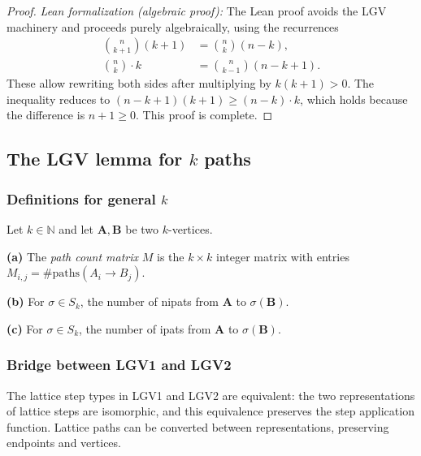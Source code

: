 \begin{proof}
\emph{Lean formalization (algebraic proof):} The Lean proof avoids the
LGV machinery and proceeds purely algebraically, using the recurrences
\begin{align*}
  \binom{n}{k+1}(k+1) &= \binom{n}{k}(n-k), \\
  \binom{n}{k} \cdot k &= \binom{n}{k-1}(n-k+1).
\end{align*}
These allow rewriting both sides after multiplying by $k(k+1) > 0$.
The inequality reduces to $(n-k+1)(k+1) \ge (n-k) \cdot k$, which
holds because the difference is $n + 1 \ge 0$. This proof is
complete.
\end{proof}

\subsection{The LGV lemma for $k$ paths}

\subsubsection{Definitions for general $k$}

\begin{definition}
\label{def.lgv.pathmatrixK}
\leanhelper
\leanok
Let $k \in \mathbb{N}$ and let $\mathbf{A}, \mathbf{B}$ be two $k$-vertices.

\textbf{(a)} The \emph{path count matrix} $M$
is the $k \times k$ integer matrix with entries
$M_{i,j} = \#\mathrm{paths}(A_i \to B_j)$.

\textbf{(b)} For $\sigma \in S_k$, the number of nipats from $\mathbf{A}$ to $\sigma(\mathbf{B})$.

\textbf{(c)} For $\sigma \in S_k$, the number of ipats from $\mathbf{A}$ to $\sigma(\mathbf{B})$.
\end{definition}

\subsubsection{Bridge between LGV1 and LGV2}

\begin{lemma}
\label{lem.lgv.step-equiv}
\leanhelper
\leanok
The lattice step types in LGV1 and LGV2 are equivalent:
the two representations of lattice steps are isomorphic, and this
equivalence preserves the step application function. Lattice paths can be
converted between representations, preserving endpoints and vertices.
\end{lemma}

